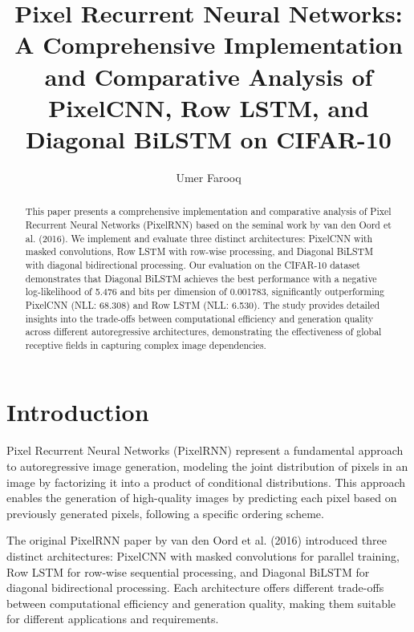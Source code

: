 \documentclass[norunningheads]{llncs}
\begin{document}
\title{Pixel Recurrent Neural Networks: A Comprehensive Implementation and Comparative Analysis of PixelCNN, Row LSTM, and Diagonal BiLSTM on CIFAR-10}

\author{Umer Farooq}


\maketitle

\begin{abstract}
This paper presents a comprehensive implementation and comparative analysis of Pixel Recurrent Neural Networks (PixelRNN) based on the seminal work by van den Oord et al. (2016). We implement and evaluate three distinct architectures: PixelCNN with masked convolutions, Row LSTM with row-wise processing, and Diagonal BiLSTM with diagonal bidirectional processing. Our evaluation on the CIFAR-10 dataset demonstrates that Diagonal BiLSTM achieves the best performance with a negative log-likelihood of 5.476 and bits per dimension of 0.001783, significantly outperforming PixelCNN (NLL: 68.308) and Row LSTM (NLL: 6.530). The study provides detailed insights into the trade-offs between computational efficiency and generation quality across different autoregressive architectures, demonstrating the effectiveness of global receptive fields in capturing complex image dependencies.

\end{abstract}

\section{Introduction}

Pixel Recurrent Neural Networks (PixelRNN) represent a fundamental approach to autoregressive image generation, modeling the joint distribution of pixels in an image by factorizing it into a product of conditional distributions. This approach enables the generation of high-quality images by predicting each pixel based on previously generated pixels, following a specific ordering scheme.

The original PixelRNN paper by van den Oord et al. (2016) introduced three distinct architectures: PixelCNN with masked convolutions for parallel training, Row LSTM for row-wise sequential processing, and Diagonal BiLSTM for diagonal bidirectional processing. Each architecture offers different trade-offs between computational efficiency and generation quality, making them suitable for different applications and requirements.
\end{document}
